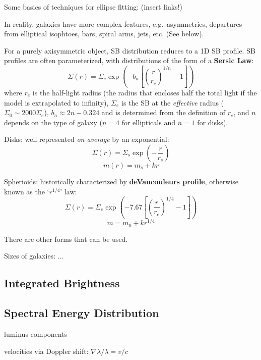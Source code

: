 \documentclass[12pt]{article}
\begin{document}
Some basics of techniques for ellipse fitting: (insert links!)

In reality, galaxies have more complex features, e.g.\ asymmetries,
departures from elliptical isophtoes, bars, spiral arms, jets, etc.
(See below).

For a purely axisymmetric object, SB distribution reduces to a 1D SB profile.
SB profiles are often parameterized, with distributions of the form
of a \textbf{Sersic Law}:
$$ \Sigma(r) = \Sigma_e\exp\left(-b_n\left[\left(
\frac{r}{r_e}\right)^{1/n}-1\right]\right) $$
where $r_e$ is the half-light radius (the radius that encloses half the
total light if the model is extrapolated to infinity),
$\Sigma_e$ is the SB at the \emph{effective} radius
($\Sigma_0 \sim 2000\Sigma_e$),
$b_n \approx 2n - 0.324$ and is determined from the definition of $r_e$,
and $n$ depends on the type of galaxy
($n=4$ for ellipticals and $n=1$ for disks).
\begin{itemize*}
    \item Disks: well represented \emph{on average} by an exponential:
        $$ \Sigma(r) = \Sigma_s\exp\left(-\frac{r}{r_s}\right) $$
        $$ m(r) = m_s + kr $$
    \item Spherioids: historically characterized by
        \textbf{deVaucouleurs profile}, otherwise known as the
        `$r^{1/4}$' law:
        $$ \Sigma(r) = \Sigma_e\exp\left(-7.67\left[\left(
            \frac{r}{r_e}\right)^{1/4}-1\right] \right)$$
        $$ m = m_0 + kr^{1/4}$$
\end{itemize*}
There are other forms that can be used.

Sizes of galaxies:
$\ldots$

\subsection*{Integrated Brightness}

\subsection*{Spectral Energy Distribution}
\begin{itemize*}
    \item luminus components
    \item velocities via Doppler shift: $\nabla \lambda / \lambda = v/c $
\end{itemize*}
\end{document}
